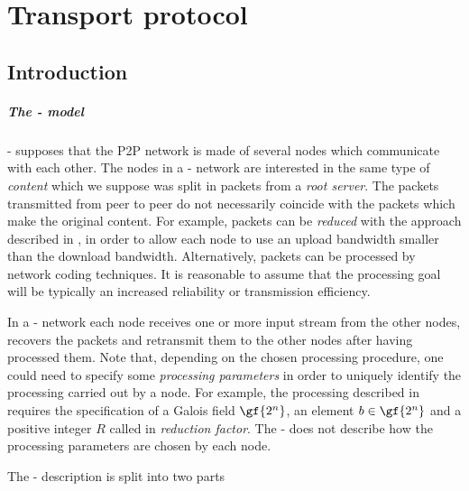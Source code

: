 \documentclass{rfc}
\begin{document}
\chapter{Transport protocol}
\label{sect:0;driver}

\section{Introduction}
\label{subsub:0.0.1;driver}

\paragraph{The \ppetp- model} \ppetp- supposes that the P2P network is
made of several nodes which communicate with each other.  The nodes in
a \ppetp- network are interested in the same type of \emph{content}
which we suppose was split in packets from a \emph{root server}.  The
packets transmitted from peer to peer do not necessarily coincide with
the packets which make the original content.  For example, packets can
be \emph{reduced} with the approach described in
\cite{bernardini08:dcc08}, in order to allow each node to use an
upload bandwidth smaller than the download bandwidth.  Alternatively,
packets can be processed by network coding techniques.  It is
reasonable to assume that the processing goal will be typically an
increased reliability or transmission efficiency.

In a \ppetp- network each node receives one or more input stream from
the other nodes, recovers the packets and retransmit them to the other
nodes after having processed them.  Note that, depending on the chosen
processing procedure, one could need to specify some \emph{processing
  parameters} in order to uniquely identify the processing carried out
by a node.  For example, the processing described in
\cite{bernardini08:dcc08} requires the specification of a Galois field
$\gf{2^n}$, an element $b\in \gf{2^n}$ and a positive integer $R$
called in \cite{bernardini08:dcc08} \emph{reduction factor}.  The
\ppetp- does not describe how the processing parameters are chosen by
each node.

The \ppetp- description is split into two parts
\end{document}
